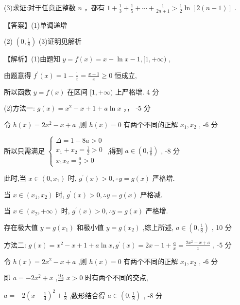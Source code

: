 \documentclass[10pt]{article}
\begin{document}
(3)求证:对于任意正整数 \(n\) ，都有 \(1 + \frac{1}{3} + \frac{1}{5} + \cdots  + \frac{1}{{2n} + 1} > \frac{1}{2}\ln \left\lbrack  {2\left( {n + 1}\right) }\right\rbrack\) .

【答案】(1)单调递增

(2) \(\left( {0,\frac{1}{8}}\right)\) (3)证明见解析

【解析】(1)由题知 \(y = f\left( x\right)  = x - \ln x - 1,\lbrack 1, + \infty )\) ,

由题意得 \({f}^{\prime }\left( x\right)  = 1 - \frac{1}{x} = \frac{x - 1}{x} \geq  0\) 恒成立,

所以函数 \(y = f\left( x\right)\) 在区间 \(\lbrack 1, + \infty )\) 上严格增. 4 分

(2)方法一: \(g\left( x\right)  = {x}^{2} - x + 1 + a\ln x\) ，， -5 分

令 \(h\left( x\right)  = 2{x}^{2} - x + a\) ,则 \(h\left( x\right)  = 0\) 有两个不同的正解 \({x}_{1},{x}_{2}\) , -6 分

所以只需满足 \(\left\{  \begin{array}{l} \Delta  = 1 - {8a} > 0 \\  {x}_{1} + {x}_{2} = \frac{1}{2} > 0 \\  {x}_{1}{x}_{2} = \frac{a}{2} > 0 \end{array}\right.\) ,得到 \(a \in  \left( {0,\frac{1}{8}}\right)\) , -8 分

此时,当 \(x \in  \left( {0,{x}_{1}}\right)\) 时, \({g}^{\prime }\left( x\right)  > 0,\therefore y = g\left( x\right)\) 严格增.

当 \(x \in  \left( {{x}_{1},{x}_{2}}\right)\) 时, \({g}^{\prime }\left( x\right)  > 0,\therefore y = g\left( x\right)\) 严格减.

当 \(x \in  \left( {{x}_{2}, + \infty }\right)\) 时, \({g}^{\prime }\left( x\right)  > 0,\therefore y = g\left( x\right)\) 严格增.

存在极大值 \(y = g\left( {x}_{1}\right)\) 和极小值 \(y = g\left( {x}_{2}\right)\) ,综上所述, \(a \in  \left( {0,\frac{1}{8}}\right)\) , 10 分

方法二: \(g\left( x\right)  = {x}^{2} - x + 1 + a\ln x,{g}^{\prime }\left( x\right)  = {2x} - 1 + \frac{a}{x} = \frac{2{x}^{2} - x + a}{x}\) , -5 分

令 \(h\left( x\right)  = 2{x}^{2} - x + a\) ,则 \(h\left( x\right)  = 0\) 有两个不同的正解 \({x}_{1},{x}_{2}\) , -6 分

即 \(a =  - 2{x}^{2} + x\) ,当 \(x > 0\) 时有两个不同的交点,

\(a =  - 2{\left( x - \frac{1}{4}\right) }^{2} + \frac{1}{8}\) ,数形结合得 \(a \in  \left( {0,\frac{1}{8}}\right)\) , -8 分
\end{document}
